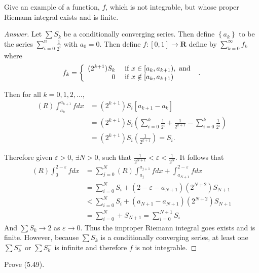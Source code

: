 \documentclass[12pt]{book}
\newcommand{\set}[1]{\left\{ #1 \right\}}
\newcommand{\R}{\mathbf{R}}
\newcommand{\tand}{\text{ and }}
\renewcommand{\t}[1]{\text{ #1 }}
\renewcommand{\.}{\mkern1mu}
\newcommand{\e}{\varepsilon}
\renewcommand{\qed}{\hfill $\blacksquare$}
\newcommand{\ea}{\hfill $\bf{\dashv}$}
\newenvironment{ans}{\begin{proof}[Answer] \renewcommand{\qed}{\ea}\setlength{\parindent}{\normalparindent}\setlength{\parskip}{\normalparskip}}{\end{proof}}
\theoremstyle{theorem}
\renewcommand{\bf}[1]{\boldsymbol{#1}}
\newlength{\normalparindent}
\newlength{\normalparskip}
\begin{document}
	\item Give an example of a function, $f$, which is not integrable, but whose proper Riemann integral exists and is finite. 
		\begin{ans}
			Let $\sum S_k$ be a conditionally converging series. Then define $\set{a_k}$ to be the series $\sum_{i=0}^n \frac{1}{2^i}$ with $a_0 = 0$. Then define $f:[0,1]\to\R$ define by $\sum_{k=0}^\infty f_k$ where 
			\[ f_k = \left\{
				\begin{array}{r l}
					(2^{k+1})S_k & \t{if } x\in [a_k, a_{k+1}), \tand\\
					0 & \t{if } x\notin [a_k, a_{k+1})
				\end{array}\right. .
			 \]
		
		Then for all $k = 0,1,2, \ldots$, 
			\begin{align}
				(R)\int_{a_k}^{a_{k+1}} f dx & = (2^{k+1})S_i[a_{k+1} - a_k]\\
					&= (2^{k+1})S_i \left(\sum_{i=0}^k \frac{1}{2^i} + \frac{1}{2^{k+1}} - \sum_{i=0}^k \frac{1}{2^i}\right)\\
					&= (2^{k+1})S_i(\frac{1}{2^{k+1}}) = S_i.
			\end{align}
			
		Therefore given $\e > 0$, $\exists N > 0$, such that $\frac{1}{2^{N+1}} < \e < \frac{1}{2^N}$. It follows that 
			\begin{align*}
				(R)\int_0^{2-\e} f dx & = \sum_{j=0}^N (R)\int_{a_j}^{a_{j+1}}f dx + \int_{a_{N+1}}^{2-\e} f dx\\
					&= \sum_{i=0}^N S_i + (2- \e - a_{N+1})(2^{N+2})S_{N+1}\\
					&< \sum_{i=0}^N S_i + (a_{N+1} - a_{N+1})(2^{N+2})S_{N+1}\\
					&= \sum_{i=0}^N + S_{N+1} = \sum_{i=0}^{N+1}S_i
			\end{align*}
		And $\sum S_k \to 2$ as $\e \to 0$. Thus the improper Riemann integral goes exists and is finite. However, because $\sum S_k$ is a conditionally converging series, at least one $\sum S_k^+$ or $\sum S_k^-$ is infinite and therefore $f$ is not integrable.
		\end{ans}
	\item Prove (5.49).
	
\end{document}
